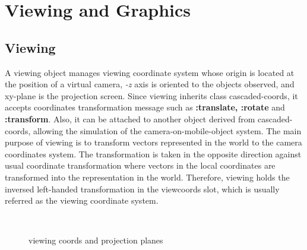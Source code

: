\section{Viewing and Graphics}

\subsection{Viewing}
A viewing object manages viewing coordinate system
whose origin is located at the position of a virtual camera,
{\em -z} axis is oriented to the objects observed, and xy-plane is the
projection screen.
Since viewing inherits class cascaded-coords,
it accepts coordinates transformation message
such as {\bf :translate, :rotate} and {\bf :transform}.
Also, it can be attached to another object derived from cascaded-coords,
allowing the simulation of the camera-on-mobile-object system.
The main purpose of viewing is to transform vectors represented in the world
to the camera coordinates system.
The transformation is taken in the opposite direction against usual coordinate
transformation where vectors in the local coordinates are transformed into the
representation in the world.
Therefore, viewing holds the inversed left-handed transformation in
the viewcoords slot, which is usually referred as the viewing coordinate system.

\begin{figure}
\begin{center}
\mbox{
\epsfsize=10cm
}
\end{center}
\caption{viewing coords and projection planes}
\end{figure}

